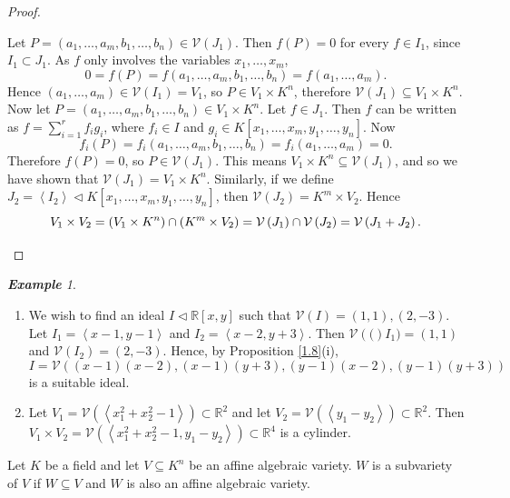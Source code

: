 \documentclass[titlepage]{article}
\theoremstyle{remark}
\newtheorem{example}[definition]{\textbf{Example}}
\newcommand{\idealof}{\vartriangleleft}
\newcommand{\idealgen}[1]{\ensuremath{\left\langle#1\right\rangle}}
\newcommand{\seq}[2]{\ensuremath{#1_1,\dots,#1_{#2}}}
\newcommand{\var}[1]{\ensuremath{\mathcal{V}\left(#1\right)}}
\begin{document}
\begin{proof}
\begin{enumerate}
        Let $P=(\seq{a}{m},\seq{b}{n})\in\mathcal{V}(J_1)$. Then $f(P)=0$ for every $f\in I_1$, since $I_1\subset J_1$. As $f$ only involves the variables $\seq{x}{m}$,
        \[0=f(P)=f(\seq{a}{m},\seq{b}{n})=f(\seq{a}{m}).\]
        Hence $(\seq{a}{m})\in\mathcal{V}(I_1)=V_1$, so $P\in V_1\times K^n$, therefore $\mathcal{V}(J_1)\subseteq V_1\times K^n$.\\
        Now let $P=(\seq{a}{m},\seq{b}{n})\in V_1\times K^n$. Let $f\in J_1$. Then $f$ can be written as $f=\sum\limits_{i=1}^r{f_ig_i}$, where $f_i\in I$ and $g_i\in K[\seq{x}{m},\seq{y}{n}]$. Now
        \[f_i(P)=f_i(a_1,\dots,a_m,\seq{b}{n})=f_i(\seq{a}{m})=0.\]
        Therefore $f(P)=0$, so $P\in\mathcal{V}(J_1)$. This means $V_1\times K^n\subseteq\var{J_1}$, and so we have shown that $\var{J_1}=V_1\times K^n$.
        Similarly, if we define $J_2=\idealgen{I_2}\idealof K[\seq{x}{m},\seq{y}{n}]$, then $\var{J_2}=K^m\times V_2$. Hence
        \[V_1\times V_2=(V_1\times K^n)\cap(K^m\times V_2)=\var{J_1}\cap\var{J_2}=\var{J_1+J_2}.\qedhere\]
    \end{enumerate}
  \end{proof}
  \begin{example}$ $
    \begin{enumerate}
      \item 
        We wish to find an ideal $I\idealof\mathbb{R}[x,y]$ such that $\var{I}={(1,1),(2,-3)}$. Let $I_1=\idealgen{x-1,y-1}$ and $I_2=\idealgen{x-2,y+3}$. Then $\var(I_1)={(1,1)}$ and $\var{I_2}={(2,-3)}$. Hence, by Proposition \ref{1.8}(i),
        \[I=\var{(x-1)(x-2),(x-1)(y+3),(y-1)(x-2),(y-1)(y+3)}\]
        is a suitable ideal.
      \item 
        Let $V_1=\var{\idealgen{x_1^2+x_2^2-1}}\subset\mathbb{R}^2$ and let $V_2=\var{\idealgen{y_1-y_2}}\subset\mathbb{R}^2$. Then $V_1\times V_2=\var{\idealgen{x_1^2+x_2^2-1,y_1-y_2}}\subset\mathbb{R}^4$ is a cylinder.
    \end{enumerate}
  \end{example}
  \begin{definition}
    Let $K$ be a field and let $V\subseteq K^n$ be an affine algebraic variety. $W$ is a subvariety of $V$ if $W\subseteq V$ and $W$ is also an affine algebraic variety.
  \end{definition}
\end{document}
